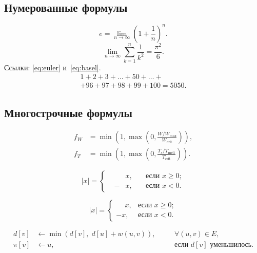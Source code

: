 \documentclass[font=modern]{cmcmsuthesis-master}
\begin{document}
\subsection{Нумерованные формулы}
\begin{equation}\label{eq:euler}e=\lim_{n\to\infty}\left(1+\frac{1}{n}\right)^{\!n}.\end{equation}
\begin{equation}\label{eq:basel}\lim_{n\to\infty}\sum_{k=1}^n\frac{1}{k^2}=\frac{\pi^2}{6}.\end{equation}
Ссылки: \eqref{eq:euler} и~\eqref{eq:basel}.
\begin{equation}\label{eq:long}\begin{multlined}1+2+3+\dots+50+\dots+\\+96+97+98+99+100=5050.\end{multlined}\end{equation}

\subsection{Многострочные формулы}
\[\begin{aligned}f_W&=\min\!\left(1,\max\!\left(0,\frac{W/W_{\max}}{W_{\text{crit}}}\right)\right),\\f_T&=\min\!\left(1,\max\!\left(0,\frac{T_s/T_{\text{melt}}}{T_{\text{crit}}}\right)\right).\end{aligned}\]

\[|x|=\left\{\begin{alignedat}{2}& &x,\quad&\text{если }x\geqslant 0;\\&-&x,\quad&\text{если }x<0.\end{alignedat}\right.\]

\[|x|=\begin{cases}\phantom{-}x,&\text{если }x\geqslant 0;\\-x,&\text{если }x<0.\end{cases}\]

\begin{equation}\label{eq:relax}\begin{alignedat}{2}
d[v]&\gets\min(d[v],\;d[u]+w(u,v)),&\quad&\forall(u,v)\in E,\\
\pi[v]&\gets u,&\quad&\text{если }d[v]\text{ уменьшилось}.
\end{alignedat}\end{equation}
\end{document}

